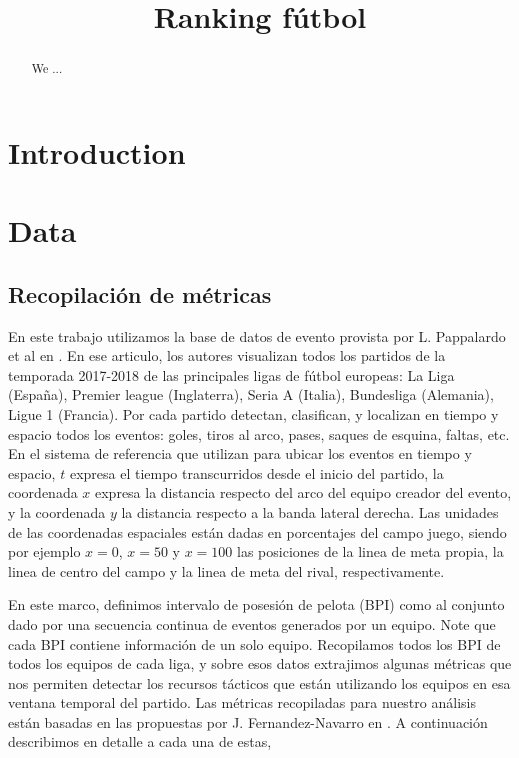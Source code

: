\documentclass[]{article}
\title{Ranking fútbol}
\author{}
\date{}
\begin{document}
	
\maketitle

\begin{abstract}
	We ...
\end{abstract}


\section{Introduction}

\section{Data}

\subsection{Recopilación de métricas}

En este trabajo utilizamos la base de datos de evento provista por L. Pappalardo et al en \cite{pappalardo2019public}. 
En ese articulo, los autores visualizan todos los partidos de la temporada 2017-2018 de las principales ligas de fútbol europeas: La Liga (España), Premier league (Inglaterra), Seria A (Italia), Bundesliga (Alemania), Ligue 1 (Francia). Por cada partido detectan, clasifican, y localizan en tiempo y espacio todos los eventos: goles, tiros al arco, pases, saques de esquina, faltas, etc. 
%
En el sistema de referencia que utilizan para ubicar los eventos en tiempo y espacio, $t$ expresa el tiempo transcurridos desde el inicio del partido, la coordenada $x$ expresa la distancia respecto del arco del equipo creador del evento, y la coordenada $y$ la distancia respecto a la banda lateral derecha. Las unidades de las coordenadas espaciales están dadas en porcentajes del campo juego, siendo por ejemplo $x=0$, $x=50$ y $x=100$ las posiciones de la linea de meta propia, la linea de centro del campo y la linea de meta del rival, respectivamente. 

En este marco, definimos intervalo de posesión de pelota (BPI) como al conjunto dado por una secuencia continua de eventos generados por un equipo. Note que cada BPI contiene información de un solo equipo.
Recopilamos todos los BPI de todos los equipos de cada liga, y sobre esos datos extrajimos algunas métricas que nos permiten detectar los recursos tácticos que están utilizando los equipos en esa ventana temporal del partido. 
Las métricas recopiladas para nuestro análisis están basadas en las propuestas por J. Fernandez-Navarro en \cite{fernandez2018influence}.
A continuación describimos en detalle a cada una de estas,
\end{document}
